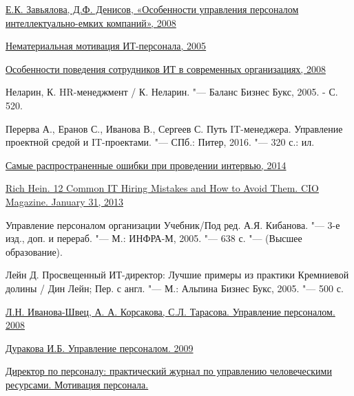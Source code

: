 \documentclass{../industrial-development}
\begin{document}
\begin{thebibliography}{99}
	 \href{https://cyberleninka.ru/article/v/osobennosti-upravleniya-personalom-intellektualno-emkih-kompaniy}{Е.К. Завьялова, Д.Ф. Денисов, «Особенности управления персоналом интеллектуально-емких компаний», 2008}
	
	 \href{http://hr-portal.ru/article/nematerialnaya-motivaciya-it-personala
	}{Нематериальная мотивация ИТ-персонала, 2005}
	
	
	 \href{http://www.0ck.ru/menedzhment_i_trudovye_otnosheniya/osobennosti_povedeniya_sotrudnikov_it_v.html}{Особенности поведения сотрудников ИТ в современных организациях, 2008}
	
	 Неларин, К. HR-менеджмент / К. Неларин. "--- Баланс Бизнес Букс, 2005. - С. 520.
	
	 Перерва А., Еранов С., Иванова В., Сергеев С. Путь IT-менеджера. Управление проектной средой и IT-проектами. "--- СПб.: Питер, 2016. "--- 320 с.: ил.
	
	 \href{http://bishelp.ru/business/personal/samye-rasprostranennye-oshibki-pri-provedenii-intervyu}{Самые распространенные ошибки при проведении интервью, 2014}
	
	 \href{https://www.osp.ru/cio/2013/08/13036953/}{Rich Hein. 12 Common IT Hiring Mistakes and How to Avoid Them. CIO Magazine. January 31, 2013}
	
	 Управление персоналом организации Учебник/Под ред. А.Я. Кибанова. "--- 3-е изд., доп. и перераб. "--- М.: ИНФРА-М, 2005. "--- 638 с. "--- (Высшее образование).
	
	 Лейн Д. Просвещенный ИТ-директор: Лучшие примеры из практики Кремниевой долины / Дин Лейн; Пер. с англ. "--- М.: Альпина Бизнес Букс, 2005. "--- 500 с.
	
	 \href{http://finances.social/upravlenie-personalom_709/modeli-upravleniya-personalom-33032.html} {Л.Н. Иванова-Швец, А. А. Корсакова, С.Л. Тарасова. Управление персоналом. 2008}
	
	 \href{https://textbooks.studio/menedjment-upravlenie-personalom/osnovnyie-elementyi-planirovaniya-26893.html}{Дуракова И.Б. Управление персоналом. 2009}
	
	 \href{https://www.hr-director.ru/rubric/6507-motivatsiya-personala}{Директор по персоналу: практический журнал по управлению человеческими ресурсами. Мотивация персонала.}
	

\end{thebibliography}
\end{document}
